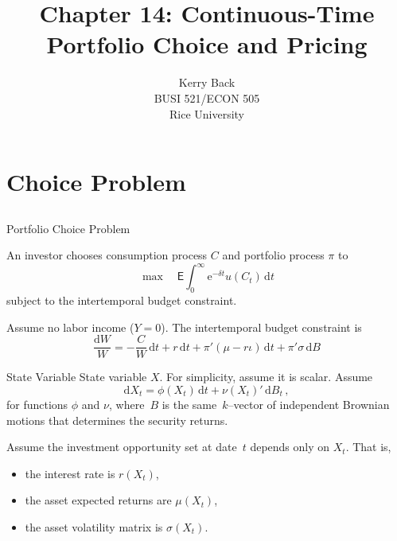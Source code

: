 \documentclass[10pt]{beamer}
\title{Chapter 14: Continuous-Time Portfolio Choice and Pricing}
\date{}
\author{Kerry Back\\ 
BUSI 521/ECON 505\\
Rice University}
\newcommand{\D}{\mathrm{d}}
\newcommand{\E}{\mathrm{e}}
\newcommand{\mye}{\ensuremath{\mathsf{E}}}
\begin{document}
\maketitle

\section{Choice Problem}\subsection{}

\begin{frame}{Portfolio Choice Problem}

An investor chooses consumption process $C$ and portfolio process $\pi$ to 
$$\max \quad \mye \int_0^\infty \E^{-\delta t}u(C_t)\,\D t$$
subject to the intertemporal budget constraint.

 Assume no labor income ($Y=0$).  The intertemporal budget constraint is
$$\frac{\D W}{W} = -\frac{C}{W}\,\D t + r\,\D t+\pi'(\mu-r\iota)\,\D t + \pi'\sigma\,\D B$$

\end{frame}


\begin{frame}{State Variable}
  State variable $X$.  For simplicity, assume it is scalar.  
 Assume 
$$
	\D X_t = \phi(X_t)\,\D t + \nu(X_t)'\,\D B_t\,,
$$
for functions $\phi$ and $\nu$, where~$B$ is the same~$k$--vector of independent Brownian motions that determines the security 
returns.

 Assume the investment opportunity set at date~$t$ depends only on $X_t$.  That is,

\begin{itemize}
    \item  the interest rate is $r(X_t)$,
\item the asset expected returns are $\mu(X_t)$,
\item the asset volatility matrix is $\sigma(X_t)$.
\end{itemize}
\end{frame}
\end{document}
